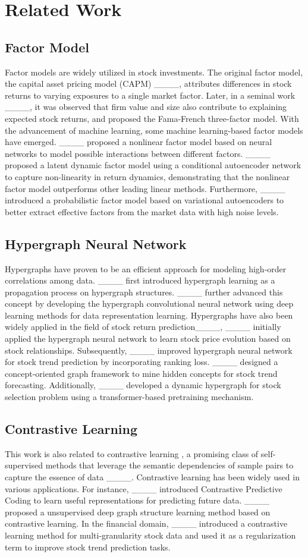 \section{Related Work}
\subsection{Factor Model}
Factor models are widely utilized in stock investments. The original factor model, the capital asset pricing model (CAPM) ____, attributes differences in stock returns to varying exposures to a single market factor. Later, in a seminal work ____, it was observed that firm value and size also contribute to explaining expected stock returns, and proposed the Fama-French three-factor model.
With the advancement of machine learning, some machine learning-based factor models have emerged. ____ proposed a nonlinear factor model based on neural networks to model possible interactions between different factors. ____ proposed a latent dynamic factor model using a conditional autoencoder network to capture non-linearity in return dynamics, demonstrating that the nonlinear factor model outperforms other leading linear methods. Furthermore, ____ introduced a probabilistic factor model based on variational autoencoders to better extract effective factors from the market data with high noise levels.

\subsection{Hypergraph Neural Network}
Hypergraphs have proven to be an efficient approach for modeling high-order correlations among data. ____ first introduced hypergraph learning as a propagation process on hypergraph structures. ____ further advanced this concept by developing the hypergraph convolutional neural network using deep learning methods for data representation learning. Hypergraphs have also been widely applied in the field of stock return prediction____, ____ initially applied the hypergraph neural network to learn stock price evolution based on stock relationships. Subsequently, ____ improved hypergraph neural network for stock trend prediction by incorporating ranking loss. ____ designed a concept-oriented graph framework to mine hidden concepts for stock trend forecasting. Additionally, ____ developed a dynamic hypergraph for stock selection problem using a transformer-based pretraining mechanism.

\subsection{Contrastive Learning}
This work is also related to contrastive learning , a promising class of self-supervised methods that leverage the semantic dependencies of sample pairs to capture the essence of data ____. Contrastive learning has been widely used in various applications. For instance, ____ introduced Contrastive Predictive Coding to learn useful representations for predicting future data. ____ proposed a unsupervised deep graph structure learning method based on contrastive learning. In the financial domain, ____ introduced a contrastive learning method for multi-granularity stock data and used it as a regularization term to improve stock trend prediction tasks.